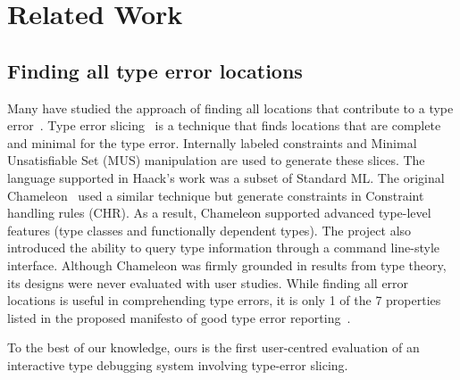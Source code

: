\section{Related Work}



\subsection{Finding all type error locations}
Many have studied the approach of finding all locations that contribute to a type error~\cite{stuckey_interactive_2003, haack_type_2004, pavlinovic_practical_2015, schilling_constraint-free_2012}. Type error slicing~\cite{haack_type_2004} is a technique that finds locations that are complete and minimal for the type error. Internally labeled constraints and Minimal Unsatisfiable Set (MUS) manipulation are used to generate these slices. The language supported in Haack's work was a subset of Standard ML. The original Chameleon~\cite{stuckey_interactive_2003} used a similar technique but generate constraints in Constraint handling rules (CHR). As a result,  Chameleon supported advanced type-level features (type classes and functionally dependent types). The project also introduced the ability to query type information through a command line-style interface. Although Chameleon was firmly grounded in results from type theory, its designs were never evaluated with user studies. While finding all error locations is useful in comprehending type errors, it is only 1 of the 7 properties listed in the proposed manifesto of good type error reporting~\cite{yang_improved_2000}.

To the best of our knowledge, ours is the first user-centred evaluation of an interactive type debugging system involving type-error slicing.


